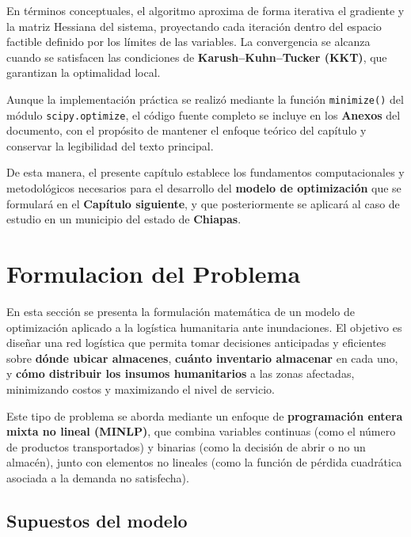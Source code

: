 \documentclass[
  spanish,
  us-letterpaper,
  DIV=11,
  numbers=noendperiod]{scrreprt}
\numberwithin{equation}{section}
\begin{document}
En términos conceptuales, el algoritmo aproxima de forma iterativa el
gradiente y la matriz Hessiana del sistema, proyectando cada iteración
dentro del espacio factible definido por los límites de las variables.
La convergencia se alcanza cuando se satisfacen las condiciones de
\textbf{Karush--Kuhn--Tucker (KKT)}, que garantizan la optimalidad
local.

Aunque la implementación práctica se realizó mediante la función
\texttt{minimize()} del módulo \texttt{scipy.optimize}, el código fuente
completo se incluye en los \textbf{Anexos} del documento, con el
propósito de mantener el enfoque teórico del capítulo y conservar la
legibilidad del texto principal.

De esta manera, el presente capítulo establece los fundamentos
computacionales y metodológicos necesarios para el desarrollo del
\textbf{modelo de optimización} que se formulará en el \textbf{Capítulo
siguiente}, y que posteriormente se aplicará al caso de estudio en un
municipio del estado de \textbf{Chiapas}.


\chapter{Formulacion del Problema}\label{formulacion-del-problema}

En esta sección se presenta la formulación matemática de un modelo de
optimización aplicado a la logística humanitaria ante inundaciones. El
objetivo es diseñar una red logística que permita tomar decisiones
anticipadas y eficientes sobre \textbf{dónde ubicar almacenes},
\textbf{cuánto inventario almacenar} en cada uno, y \textbf{cómo
distribuir los insumos humanitarios} a las zonas afectadas, minimizando
costos y maximizando el nivel de servicio.

Este tipo de problema se aborda mediante un enfoque de
\textbf{programación entera mixta no lineal (MINLP)}, que combina
variables continuas (como el número de productos transportados) y
binarias (como la decisión de abrir o no un almacén), junto con
elementos no lineales (como la función de pérdida cuadrática asociada a
la demanda no satisfecha).

\section{Supuestos del modelo}\label{supuestos-del-modelo}
\end{document}
